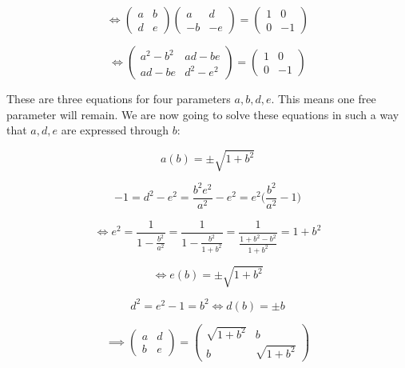\documentclass{article}
\begin{document}
\begin{equation}
\iff
\begin{pmatrix}
a & b
\\
d & e
\end{pmatrix}
\begin{pmatrix}
a & d
\\
-b & -e
\end{pmatrix}
=
\begin{pmatrix}
1 & 0
\\
0 & -1
\end{pmatrix}
\end{equation}

\begin{equation}
\iff
\begin{pmatrix}
a^2-b^2 & ad-be
\\
ad-be & d^2-e^2
\end{pmatrix}
=
\begin{pmatrix}
1 & 0
\\
0 & -1
\end{pmatrix}
\end{equation}




These are three equations for four parameters $a,b,d,e$. This means one free parameter will remain.
We are now going to solve these equations in such a way that $a,d,e$ are expressed through $b$:

\begin{equation}
a(b) = \pm \sqrt{1+b^2}
\end{equation}

\begin{equation}
-1 = d^2-e^2 = \frac{b^2e^2}{a^2} -e^2 = e^2 \bigg(\frac{b^2}{a^2} - 1 \bigg)
\end{equation}

\begin{equation}
\iff e^2 = \frac{1}{1-\frac{b^2}{a^2}} = \frac{1}{1-\frac{b^2}{1+b^2}} = \frac{1}{\frac{1+b^2-b^2}{1+b^2}} = 1+b^2
\end{equation}

\begin{equation}
\iff e(b) = \pm \sqrt{1+b^2}
\end{equation}


\begin{equation}
d^2 = e^2 -1 = b^2 \iff d(b) = \pm b
\end{equation}

\begin{equation} \label{matrixExpressedByB}
\implies
\begin{pmatrix}
a & d
\\
b & e
\end{pmatrix}
=
\begin{pmatrix}
\sqrt{1+b^2} & b
\\
b & \sqrt{1+b^2}
\end{pmatrix}
\end{equation}
\end{document}
